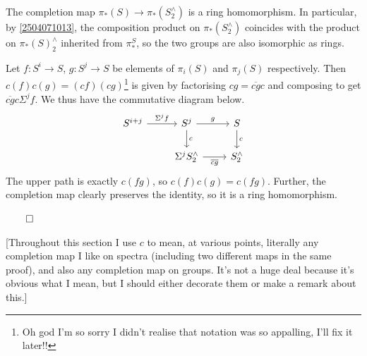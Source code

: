\documentclass{MetricNotes2023}
\def\done{\begin{flushright}\vspace{-4.35ex}\(\qed\)\end{flushright}}
\begin{document}
\begin{lemma}
The completion map \(\pi_*(S) \to \pi_*(S^\wedge_2)\) is a ring homomorphism. In particular, by \ref{2504071013}, the composition product on \(\pi_*(S^\wedge_2)\) coincides with the product on \(\pi_*(S)^\wedge_2\) inherited from \(\pi_*^S\), so the two groups are also isomorphic as rings. 
\end{lemma}

\begin{ourproof}
Let \(f : S^i \to S\), \(g : S^j \to S\) be elements of \(\pi_i(S)\) and \(\pi_j(S)\) respectively. Then \(c(f)c(g)=(cf)(cg)\)\footnote{Oh god I'm so sorry I didn't realise that notation was so appalling, I'll fix it later!!} is given by factorising \(cg=\overline{cg}c\) and composing to get \(\overline{cg}c\Sigma^jf\). We thus have the commutative diagram below.
\[\begin{tikzcd}
S^{i+j} \arrow[r, "\Sigma^j f"]  & S^j \arrow[r, "g"] \arrow[d, "c"] & S \arrow[d, "c"] \\ 
 & \Sigma^jS^\wedge_2  \arrow[r, "\overline{cg}"'] & S^\wedge_2 
 \end{tikzcd}\] 
The upper path is exactly \(c(fg)\), so \(c(f)c(g)=c(fg)\). Further, the completion map clearly preserves the identity, so it is a ring homomorphism.\done
\end{ourproof}

[Throughout this section I use \(c\) to mean, at various points, literally any completion map I like on spectra (including two different maps in the same proof), and also any completion map on groups. It's not a huge deal because it's obvious what I mean, but I should either decorate them or make a remark about this.]

\end{document}

